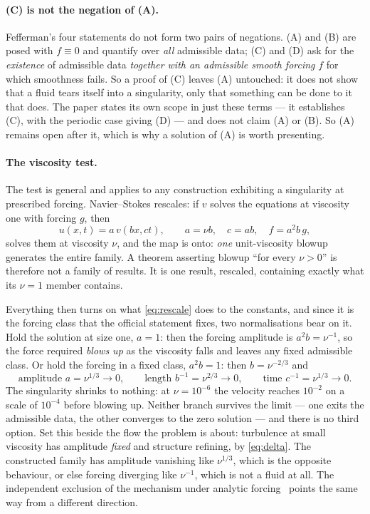 \documentclass[11pt]{article}
\begin{document}
\paragraph{(C) is not the negation of (A).} Fefferman's four statements do not form two pairs of
negations. (A) and (B) are posed with $f\equiv0$ and quantify over \emph{all} admissible data;
(C) and (D) ask for the \emph{existence} of admissible data \emph{together with an admissible
smooth forcing} $f$ for which smoothness fails. So a proof of (C) leaves (A) untouched: it does not
show that a fluid tears itself into a singularity, only that something can be done to it that does.
The paper states its own scope in just these terms --- it establishes (C), with the periodic case
giving (D) --- and does not claim (A) or (B). So (A) remains open after it, which is why a solution
of (A) is worth presenting.

\paragraph{The viscosity test.} The test is general and applies to any construction exhibiting a
singularity at prescribed forcing. Navier--Stokes rescales: if $v$ solves the equations at viscosity
one with forcing $g$, then
\begin{equation}\label{eq:rescale}
u(x,t) = a\,v(bx,ct),\qquad a = \nu b,\quad c = ab,\quad f = a^2 b\,g,
\end{equation}
solves them at viscosity $\nu$, and the map is onto: \emph{one} unit-viscosity blowup generates the
entire family. A theorem asserting blowup ``for every $\nu>0$'' is therefore not a family of
results. It is one result, rescaled, containing exactly what its $\nu=1$ member contains.

Everything then turns on what \eqref{eq:rescale} does to the constants, and since it is the forcing
class that the official statement fixes, two normalisations bear on it. Hold the solution at size
one, $a=1$: then the forcing amplitude is $a^2b=\nu^{-1}$, so the force required \emph{blows up} as
the viscosity falls and leaves any fixed admissible class. Or hold the forcing in a fixed class,
$a^2b=1$: then $b=\nu^{-2/3}$ and
\begin{equation}\label{eq:shrink}
\text{amplitude } a = \nu^{1/3}\to 0,\qquad
\text{length } b^{-1} = \nu^{2/3}\to 0,\qquad
\text{time } c^{-1} = \nu^{1/3}\to 0 .
\end{equation}
The singularity shrinks to nothing: at $\nu=10^{-6}$ the velocity reaches $10^{-2}$ on a scale of
$10^{-4}$ before blowing up. Neither branch survives the limit --- one exits the admissible data,
the other converges to the zero solution --- and there is no third option. Set this beside the flow
the problem is about: turbulence at small viscosity has amplitude \emph{fixed} and structure
refining, by \eqref{eq:delta}. The constructed family has amplitude vanishing like $\nu^{1/3}$,
which is the opposite behaviour, or else forcing diverging like $\nu^{-1}$, which is not a fluid at
all. The independent exclusion of the mechanism under analytic forcing~\cite{civ} points the same
way from a different direction.
\end{document}
